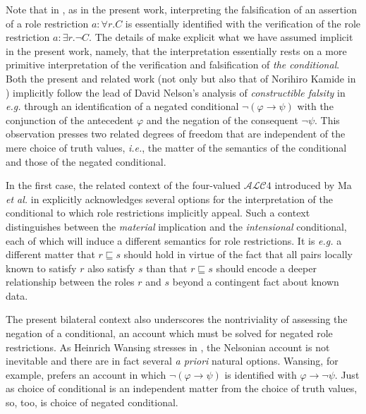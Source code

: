 \documentclass[letterpaper]{article} %
\theoremstyle{definition}
\theoremstyle{definition}
\theoremstyle{definition}
\theoremstyle{definition}
\theoremstyle{definition}
\begin{document}
Note that in \cite{DBLP:journals/semweb/MaierMH13}, as in the present work, interpreting the falsification of an assertion of a role restriction $a:\forall r.C$ is essentially identified with the verification of the role restriction $a:\exists r.\neg C$. The details of \cite{DBLP:journals/semweb/MaierMH13} make explicit what we have assumed implicit in the present work, namely, that the interpretation essentially rests on a more primitive interpretation of the verification and falsification of \emph{the conditional}. Both the present and related work (not only \cite{DBLP:journals/semweb/MaierMH13} but also that of Norihiro Kamide in \cite{DBLP:conf/kes/Kamide11}) implicitly follow the lead of David Nelson's analysis of \emph{constructible falsity} in \emph{e.g.} \cite{DBLP:journals/jsyml/AlmukdadN84} through an identification of a negated conditional $\neg(\varphi\rightarrow\psi)$ with the conjunction of the antecedent $\varphi$ and the negation of the consequent $\neg\psi$. This observation presses two related degrees of freedom that are independent of the mere choice of truth values, \emph{i.e.}, the matter of the semantics of the conditional and those of the negated conditional.

In the first case, the related context of the four-valued $\mathcal{ALC}4$ introduced by Ma \emph{et al.} in \cite{DBLP:conf/esws/MaHL07} explicitly acknowledges several options for the interpretation of the conditional to which role restrictions implicitly appeal. Such a context distinguishes between the \emph{material} implication and the \emph{intensional} conditional, each of which will induce a different semantics for role restrictions. It is \emph{e.g.} a different matter that $r\sqsubseteq s$ should hold in virtue of the fact that all pairs locally known to satisfy $r$ also satisfy $s$ than that $r\sqsubseteq s$ should encode a deeper relationship between the roles $r$ and $s$ beyond a contingent fact about known data.

The present bilateral context also underscores the nontriviality of assessing the negation of a conditional, an account which must be solved for negated role restrictions. As Heinrich Wansing stresses in \cite{DBLP:conf/aiml/Wansing10}, the Nelsonian account is not inevitable and there are in fact several \emph{a priori} natural options. Wansing, for example, prefers an account in which $\neg(\varphi\rightarrow\psi)$ is identified with $\varphi\rightarrow\neg\psi$. Just as choice of conditional is an independent matter from the choice of truth values, so, too, is choice of negated conditional. 
\end{document}
